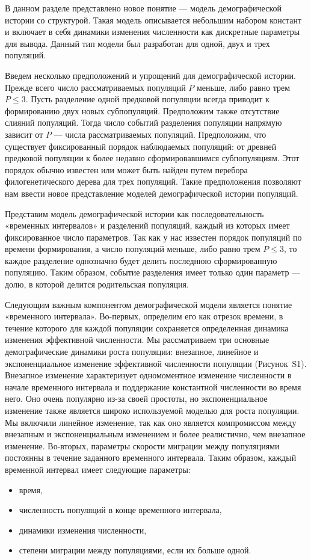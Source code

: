 В данном разделе представлено новое понятие --- модель демографической истории со структурой.
Такая модель описывается небольшим набором констант и включает в себя динамики изменения численности как дискретные параметры для вывода.
Данный тип модели был разработан для одной, двух и трех популяций.

Введем несколько предположений и упрощений для демографической истории.
Прежде всего число рассматриваемых популяций $P$ меньше, либо равно трем $P \leq 3$.
Пусть разделение одной предковой популяции всегда приводит к формированию двух новых субпопуляций.
Предположим также отсутствие слияний популяций.
Тогда число событий разделения популяции напрямую зависит от $P$ --- числа рассматриваемых популяций.
Предположим, что существует фиксированный порядок наблюдаемых популяций: от древней предковой популяции к более недавно сформировавшимся субпопуляциям.
Этот порядок обычно известен или может быть найден путем перебора филогенетического дерева для трех популяций.
Такие предположения позволяют нам ввести новое представление моделей демографической истории популяций.

Представим модель демографической истории как последовательность «временных интервалов» и разделений популяций, каждый из которых имеет фиксированное число параметров.
Так как у нас известен порядок популяций по времени формирования, а число популяций меньше, либо равно трем $P\leq 3$, то каждое разделение однозначно будет делить последнюю сформированную популяцию.
Таким образом, событие разделения имеет только один параметр --- долю, в которой делится родительская популяция.

Следующим важным компонентом демографической модели является понятие «временного интервала».
Во-первых, определим его как отрезок времени, в течение которого для каждой популяции сохраняется определенная динамика изменения эффективной численности.
Мы рассматриваем три основные демографические динамики роста популяции: внезапное, линейное и экспоненциальное изменение эффективной численности популяции (Рисунок~S1).
Внезапное изменение характеризует одномоментное изменение численности в начале временного интервала и поддержание константной численности во время него.
Оно очень популярно из-за своей простоты, но экспоненциальное изменение также является широко используемой моделью для роста популяции.
Мы включили линейное изменение, так как оно является компромиссом между внезапным и экспоненциальным изменением и более реалистично, чем внезапное изменение.
Во-вторых, параметры скорости миграции между популяциями постоянны в течение заданного временного интервала.
Таким образом, каждый временной интервал имеет следующие параметры:
\begin{itemize}
    \item время,
    \item численность популяций в конце временного интервала,
    \item динамики изменения численности,
    \item степени миграции между популяциями, если их больше одной.
\end{itemize}

